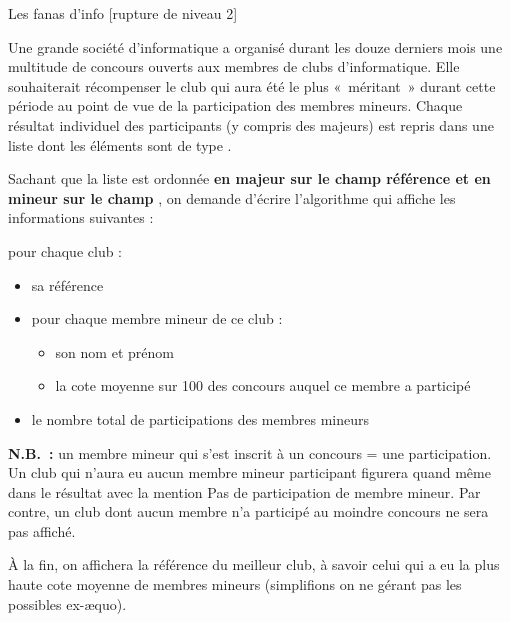\begin{Exercice}{Les fanas d'info  [rupture de niveau 2]}

	Une grande société d’informatique a organisé durant les douze derniers
	mois une multitude de concours ouverts aux membres de clubs d’informatique. 
	Elle souhaiterait récompenser le club qui aura été le plus «~méritant~» 
	durant cette période au point de vue de la participation des membres mineurs. 
	Chaque résultat individuel des participants (y compris des majeurs) est repris dans une liste
	dont les éléments sont de type .

	\begin{algo}
	\end{algo}

	Sachant que la liste est ordonnée \textbf{en majeur sur le champ \textsf{référence}
	et en mineur sur le champ }, 
	on demande d’écrire l’algorithme qui affiche les informations suivantes :

	pour chaque club :
	\begin{itemize}
		\item 
			sa référence
		\item 
			pour chaque membre mineur de ce club :
        \begin{itemize}
		    \item 
			   son nom et prénom
		    \item 
			   la cote moyenne sur 100 des concours auquel ce membre a participé
        \end{itemize}
		\item 
			le nombre total de participations des membres mineurs
	\end{itemize}
	
	\textbf{N.B.~:} un membre mineur qui s’est inscrit à un concours = une
	participation. Un club qui n’aura eu aucun membre mineur participant
	figurera quand même dans le résultat avec la mention 
	\og{}Pas de participation de membre mineur\fg{}. 
	Par contre, un club dont aucun membre n’a participé au moindre concours ne sera pas affiché.

	À la fin, on affichera la référence du meilleur club, à savoir celui qui
	a eu la plus haute cote moyenne de membres mineurs 
	(simplifions on ne gérant pas les possibles ex-\ae{}quo).

\end{Exercice}
